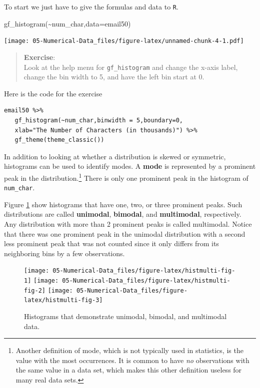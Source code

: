 \documentclass[
]{book}
\newenvironment{Shaded}{\begin{snugshade}}{\end{snugshade}}
\newcommand{\AttributeTok}[1]{\textcolor[rgb]{0.77,0.63,0.00}{#1}}
\newcommand{\FunctionTok}[1]{\textcolor[rgb]{0.00,0.00,0.00}{#1}}
\newcommand{\NormalTok}[1]{#1}
\newcommand{\SpecialCharTok}[1]{\textcolor[rgb]{0.00,0.00,0.00}{#1}}
\begin{document}
To start we just have to give the formulas and data to \texttt{R}.

\begin{Shaded}
\begin{Highlighting}[]
\FunctionTok{gf\_histogram}\NormalTok{(}\SpecialCharTok{\textasciitilde{}}\NormalTok{num\_char,}\AttributeTok{data=}\NormalTok{email50)}
\end{Highlighting}
\end{Shaded}

\texttt{[image: 05-Numerical-Data\_files/figure-latex/unnamed-chunk-4-1.pdf]}

\begin{quote}
\textbf{Exercise}:\\
Look at the help menu for \texttt{gf\_histogram} and change the x-axis label, change the bin width to 5, and have the left bin start at 0.
\end{quote}

Here is the code for the exercise

\begin{verbatim}
email50 %>%
   gf_histogram(~num_char,binwidth = 5,boundary=0,
   xlab="The Number of Characters (in thousands)") %>%
   gf_theme(theme_classic())
\end{verbatim}

In addition to looking at whether a distribution is skewed or symmetric, histograms can be used to identify modes. A \textbf{mode} is represented by a prominent peak in the distribution.\footnote{Another definition of mode, which is not typically used in statistics, is the value with the most occurrences. It is common to have \emph{no} observations with the same value in a data set, which makes this other definition useless for many real data sets.} There is only one prominent peak in the histogram of \texttt{num\_char}.

Figure \ref{fig:histmulti-fig} show histograms that have one, two, or three prominent peaks. Such distributions are called \textbf{unimodal}, \textbf{bimodal}, and \textbf{multimodal}, respectively. Any distribution with more than 2 prominent peaks is called multimodal. Notice that there was one prominent peak in the unimodal distribution with a second less prominent peak that was not counted since it only differs from its neighboring bins by a few observations.

\begin{figure}
\texttt{[image: 05-Numerical-Data\_files/figure-latex/histmulti-fig-1]} \texttt{[image: 05-Numerical-Data\_files/figure-latex/histmulti-fig-2]} \texttt{[image: 05-Numerical-Data\_files/figure-latex/histmulti-fig-3]} \caption{Histograms that demonstrate unimodal, bimodal, and multimodal data.}\label{fig:histmulti-fig}
\end{figure}
\end{document}
